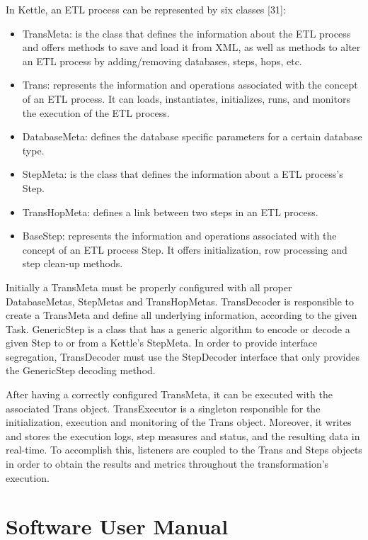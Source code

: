 \documentclass[
  11pt,
]{krantz}
\providecommand{\tightlist}{%
  \setlength{\itemsep}{0pt}\setlength{\parskip}{0pt}}
\begin{document}
In Kettle, an ETL process can be represented by six classes {[}31{]}:

\begin{itemize}
\tightlist
\item
  TransMeta: is the class that defines the information about the ETL process and offers methods to save and load it from XML, as well as methods to alter an ETL process by adding/removing databases, steps, hops, etc.
\item
  Trans: represents the information and operations associated with the concept of an ETL process. It can loads, instantiates, initializes, runs, and monitors the execution of the ETL process.
\item
  DatabaseMeta: defines the database specific parameters for a certain database type.
\item
  StepMeta: is the class that defines the information about a ETL process's Step.
\item
  TransHopMeta: defines a link between two steps in an ETL process.
\item
  BaseStep: represents the information and operations associated with the concept of an ETL process Step. It offers initialization, row processing and step clean-up methods.
\end{itemize}

Initially a TransMeta must be properly configured with all proper DatabaseMetas, StepMetas and TransHopMetas. TransDecoder is responsible to create a TransMeta and define all underlying information, according to the given Task. GenericStep is a class that has a generic algorithm to encode or decode a given Step to or from a Kettle's StepMeta. In order to provide interface segregation, TransDecoder must use the StepDecoder interface that only provides the GenericStep decoding method.

After having a correctly configured TransMeta, it can be executed with the associated Trans object. TransExecutor is a singleton responsible for the initialization, execution and monitoring of the Trans object. Moreover, it writes and stores the execution logs, step measures and status, and the resulting data in real-time. To accomplish this, listeners are coupled to the Trans and Steps objects in order to obtain the results and metrics throughout the transformation's execution.

\hypertarget{software-user-manual}{%
\chapter{Software User Manual}\label{software-user-manual}}
\end{document}
